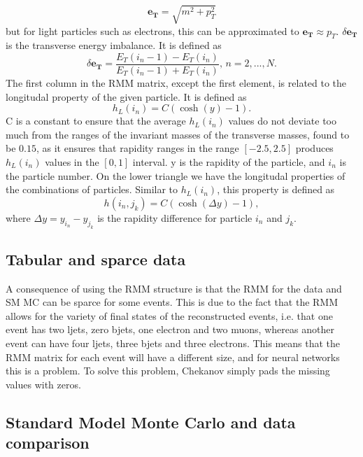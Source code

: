 \begin{equation}\label{eq:et}
    \boldsymbol{e_T} = \sqrt{m^2 + p_T^2}
\end{equation}
but for light particles such as electrons, this can be approximated to $\boldsymbol{e_T} \approx p_T$. $\delta\boldsymbol{e_T}$ 
is the transverse energy imbalance. It is defined as 
\begin{equation}\label{eq:deltaet}
    \delta\boldsymbol{e_T} = \frac{E_T(i_n-1) - E_T(i_n)}{E_T(i_n-1) + E_T(i_n)}, \, n = 2, ..., N.
\end{equation}
The first column in the RMM matrix, except the first element, is related to the longitudal property of the given particle. 
It is defined as
\begin{equation*}
    h_L(i_n) = C(\cosh{(y)} - 1).
\end{equation*}
C is a constant to ensure that the average $h_L(i_n)$ values do not deviate too much from the ranges of the invariant masses 
of the transverse masses, found to be $0.15$, as it ensures that rapidity ranges in the range $[-2.5, 2.5]$ produces $h_L(i_n)$ values in the 
$[0,1]$ interval\cite{Chekanov_2019}. y is the rapidity of the particle, and $i_n$ is the particle number. 
On the lower triangle we have the longitudal properties of the combinations of particles. Similar to $h_L(i_n)$, this property is defined as 
\begin{equation*}
    h(i_n, j_k) = C(\cosh{(\Delta y)} - 1),
\end{equation*}
where $\Delta y = y_{i_n} - y_{j_k}$ is the rapidity difference for particle $i_n$ and $j_k$. 


\subsection*{Tabular and sparce data}
A consequence of using the RMM structure is that the RMM for the data and SM MC can be sparce for some events. This is due to the fact that the RMM allows for 
the variety of final states of the reconstructed events, i.e. that one event has two ljets, zero bjets, one electron and two muons, whereas another 
event can have four ljets, three bjets and three electrons. This means that the RMM matrix for each event will have a different size, 
and for neural networks this is a problem. To solve this problem, Chekanov simply pads the missing values with zeros\cite{Chekanov_2019}. 

\subsection*{Standard Model Monte Carlo and data comparison}\label{sec:mcdatacomp}

